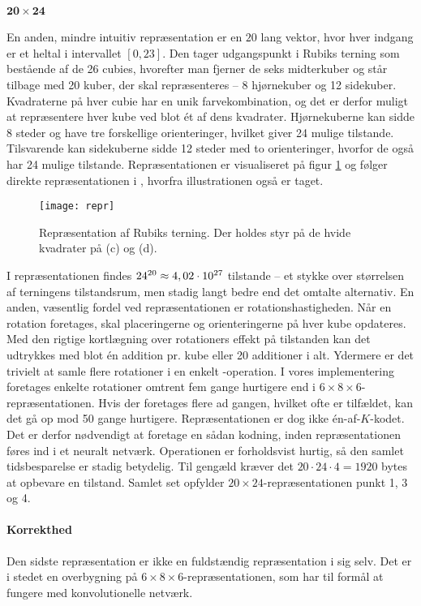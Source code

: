\documentclass[../main.tex]{subfiles}
\begin{document}
\paragraph{$ \mathbf{20\times 24} $}
En anden, mindre intuitiv repræsentation er en $ 20 $ lang vektor, hvor hver indgang er et heltal i intervallet $ [0, 23] $.
Den tager udgangspunkt i Rubiks terning som bestående af de 26 cubies, hvorefter man fjerner de seks midterkuber og står tilbage med 20 kuber, der skal repræsenteres -- 8 hjørnekuber og 12 sidekuber.
Kvadraterne på hver cubie har en unik farvekombination, og det er derfor muligt at repræsentere hver kube ved blot ét af dens kvadrater.
Hjørnekuberne kan sidde 8 steder og have tre forskellige orienteringer, hvilket giver 24 mulige tilstande.
Tilsvarende kan sidekuberne sidde 12 steder med to orienteringer, hvorfor de også har 24 mulige tilstande.
Repræsentationen er visualiseret på figur \ref{fig:kuberepr} og følger direkte repræsentationen i \cite{HumansBeGone}, hvorfra illustrationen også er taget.
\begin{figure}[H]
	\centering
	\texttt{[image: repr]}
	\caption{Repræsentation af Rubiks terning. Der holdes styr på de hvide kvadrater på (c) og (d). \cite{HumansBeGone}}\label{fig:kuberepr}
\end{figure}
\noindent
I repræsentationen findes $ 24^{20}\approx 4,02\cdot10^{27} $ tilstande -- et stykke over størrelsen af terningens tilstandsrum, men stadig langt bedre end det omtalte alternativ.
En anden, væsentlig fordel ved repræsentationen er rotationshastigheden.
Når en rotation foretages, skal placeringerne og orienteringerne på hver kube opdateres.
Med den rigtige kortlægning over rotationers effekt på tilstanden kan det udtrykkes med blot én addition pr. kube eller 20 additioner i alt.
Ydermere er det trivielt at samle flere rotationer i en enkelt -operation.
I vores implementering foretages enkelte rotationer omtrent fem gange hurtigere end i $ 6\times 8\times 6 $-repræsentationen.
Hvis der foretages flere ad gangen, hvilket ofte er tilfældet, kan det gå op mod 50 gange hurtigere.
Repræsentationen er dog ikke én-af-$ K $-kodet.
Det er derfor nødvendigt at foretage en sådan kodning, inden repræsentationen føres ind i et neuralt netværk.
Operationen er forholdsvist hurtig, så den samlet tidsbesparelse er stadig betydelig.
Til gengæld kræver det $ 20\cdot 24\cdot 4=1920 $ bytes at opbevare en tilstand.
Samlet set opfylder $ 20\times 24 $-repræsentationen punkt 1, 3 og 4.

\paragraph{Korrekthed}
Den sidste repræsentation er ikke en fuldstændig repræsentation i sig selv.
Det er i stedet en overbygning på $ 6\times 8\times 6 $-repræsentationen, som har til formål at fungere med konvolutionelle netværk.
\end{document}
